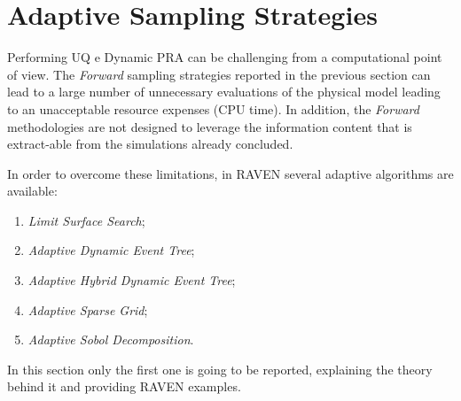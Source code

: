 \section{Adaptive Sampling Strategies}
Performing UQ e Dynamic PRA can be
challenging from a computational point of view. The \textit{Forward}
sampling strategies reported in the previous section can lead to a large number of
unnecessary evaluations of the physical model leading to an unacceptable resource expenses (CPU time).
In addition, the \textit{Forward} methodologies are not designed to leverage the information
content that is extract-able from the simulations already concluded.

In order to overcome these limitations, in RAVEN several adaptive algorithms are available:
\begin{enumerate}
  \item \textit{Limit Surface Search};
  \item \textit{Adaptive Dynamic Event Tree};
  \item \textit{Adaptive Hybrid Dynamic Event Tree};
  \item \textit{Adaptive Sparse Grid};
  \item \textit{Adaptive Sobol Decomposition}.
\end{enumerate}
In this section only the first one is going to be reported, explaining the theory behind it
and providing RAVEN examples.

